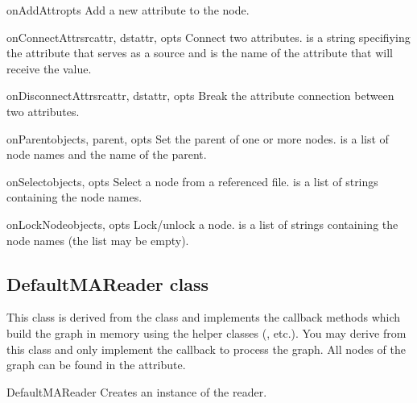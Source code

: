 \begin{methoddesc}{onAddAttr}{opts}
Add a new attribute to the node.
\end{methoddesc}

\begin{methoddesc}{onConnectAttr}{srcattr, dstattr, opts}
Connect two attributes.  is a string specifiying the
attribute that serves as a source and  is the name of
the attribute that will receive the value. 
\end{methoddesc}

\begin{methoddesc}{onDisconnectAttr}{srcattr, dstattr, opts}
Break the attribute connection between two attributes.
\end{methoddesc}

\begin{methoddesc}{onParent}{objects, parent, opts}
Set the parent of one or more nodes.  is a list of node names
and  the name of the parent.
\end{methoddesc}

\begin{methoddesc}{onSelect}{objects, opts}
Select a node from a referenced file.  is a list of strings
containing the node names.
\end{methoddesc}

\begin{methoddesc}{onLockNode}{objects, opts}
Lock/unlock a node.  is a list of strings containing the node
names (the list may be empty).
\end{methoddesc}

\subsection{DefaultMAReader class}

This class is derived from the  class and implements 
the callback methods which build the graph in memory using the helper
classes (, etc.). You may derive from this class and only
implement the  callback to process the graph. All nodes
of the graph can be found in the  attribute.

\begin{classdesc}{DefaultMAReader}{}
  Creates an instance of the reader.
\end{classdesc}

